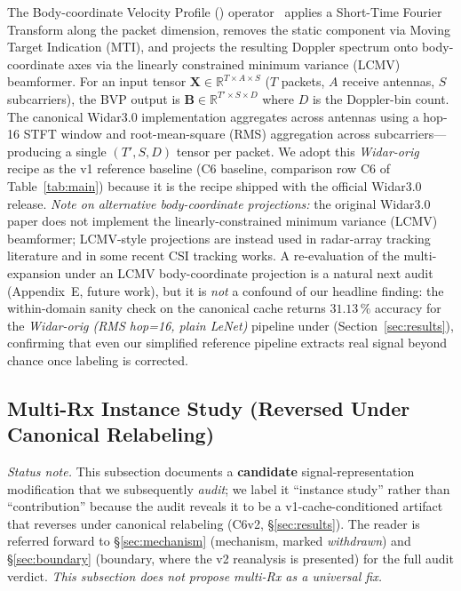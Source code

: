 \documentclass[11pt]{article}
\theoremstyle{definition}
\newcommand{\BVP}{\text{BVP}}
\newcommand{\LODO}{\text{LODO}}
\newcommand{\Rx}{\text{Rx}}
\begin{document}
The Body-coordinate Velocity Profile (\BVP) operator~\cite{zheng2019widar} applies a Short-Time Fourier Transform along the packet dimension, removes the static component via Moving Target Indication (MTI), and projects the resulting Doppler spectrum onto body-coordinate axes via the linearly constrained minimum variance (LCMV) beamformer. For an input tensor $\mathbf{X} \in \mathbb{R}^{T \times A \times S}$ ($T$ packets, $A$ receive antennas, $S$ subcarriers), the BVP output is $\mathbf{B} \in \mathbb{R}^{T' \times S \times D}$ where $D$ is the Doppler-bin count. The canonical Widar3.0 implementation aggregates across antennas using a hop-16 STFT window and root-mean-square (RMS) aggregation across subcarriers---producing a single $(T', S, D)$ tensor per packet. We adopt this \emph{Widar-orig} recipe as the v1 reference baseline (C6 baseline, comparison row C6 of Table~\ref{tab:main}) because it is the recipe shipped with the official Widar3.0 release. \emph{Note on alternative body-coordinate projections:} the original Widar3.0 paper does not implement the linearly-constrained minimum variance (LCMV) beamformer; LCMV-style projections are instead used in radar-array tracking literature and in some recent CSI tracking works. A re-evaluation of the multi-\Rx{} expansion under an LCMV body-coordinate projection is a natural next audit (Appendix~E, future work), but it is \emph{not} a confound of our headline finding: the within-domain sanity check on the canonical cache returns $31.13\,\%$ accuracy for the \emph{Widar-orig (RMS hop=16, plain LeNet)} pipeline under \LODO{} (Section~\ref{sec:results}), confirming that even our simplified reference pipeline extracts real signal beyond chance once labeling is corrected.

\subsection{Multi-Rx Instance Study (Reversed Under Canonical Relabeling)}
\label{sec:methodology-multirx}

\emph{Status note.} This subsection documents a \textbf{candidate} signal-representation modification that we subsequently \emph{audit}; we label it ``instance study'' rather than ``contribution'' because the audit reveals it to be a v1-cache-conditioned artifact that reverses under canonical relabeling (C6v2, \S\ref{sec:results}). The reader is referred forward to \S\ref{sec:mechanism} (mechanism, marked \emph{withdrawn}) and \S\ref{sec:boundary} (boundary, where the v2 reanalysis is presented) for the full audit verdict. \emph{This subsection does not propose multi-Rx as a universal fix.}
\end{document}
